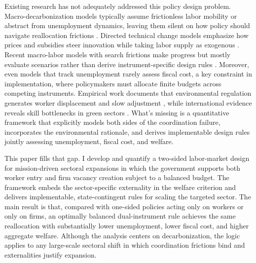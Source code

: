 \documentclass[preprint,12pt]{elsarticle}
\begin{document}
Existing research has not adequately addressed this policy design problem. Macro-decarbonization models typically assume frictionless labor mobility or abstract from unemployment dynamics, leaving them silent on how policy should navigate reallocation frictions \citep{bilal2025guide,gray2023labor,hafstead2020jobs,oecd2021assessing}. Directed technical change models emphasize how prices and subsidies steer innovation while taking labor supply as exogenous \citep{acemoglu2012environment,acemoglu2016transition,gerlagh2008shift,popp2002induced}. Recent macro-labor models with search frictions make progress but mostly evaluate scenarios rather than derive instrument-specific design rules \citep{hafstead2018,hafstead2022,castellanos2024ulmcp,shapiro2024bis}. Moreover, even models that track unemployment rarely assess fiscal cost, a key constraint in implementation, where policymakers must allocate finite budgets across competing instruments. Empirical work documents that environmental regulation generates worker displacement and slow adjustment \citep{walker2011environmental,walker2013transitional,curtis2018restat,gray2014jeem,shapiro2023}, while international evidence reveals skill bottlenecks in green sectors \citep{vona2018greenskills,ilo2019skills,BluedornHansen2022,iea2023wee,oecd2023skills}. What's missing is a quantitative framework that explicitly models both sides of the coordination failure, incorporates the environmental rationale, and derives implementable design rules jointly assessing unemployment, fiscal cost, and welfare. 

This paper fills that gap. I develop and quantify a two-sided labor-market design for mission-driven sectoral expansions in which the government supports both worker entry and firm vacancy creation subject to a balanced budget. The framework embeds the sector-specific externality in the welfare criterion and delivers implementable, state-contingent rules for scaling the targeted sector. The main result is that, compared with one-sided policies acting only on workers or only on firms, an optimally balanced dual-instrument rule achieves the same reallocation with substantially lower unemployment, lower fiscal cost, and higher aggregate welfare. Although the analysis centers on decarbonization, the logic applies to any large-scale sectoral shift in which coordination frictions bind and externalities justify expansion.
\end{document}
